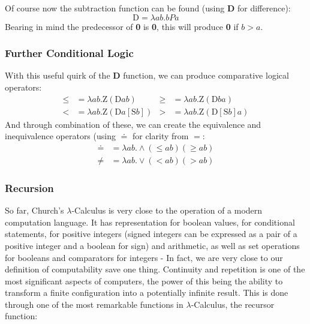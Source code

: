 \documentclass[Master.tex]{subfiles}
\begin{document}
Of course now the subtraction function can be found (using \textbf{D} for difference):
\begin{equation*}
\bm{\mathrm{D}} = \lambda ab.bPa
\end{equation*}
Bearing in mind the predecessor of \textbf{0} is \textbf{0}, this will produce \textbf{0} if $b>a$.
\subsubsection{Further Conditional Logic}

With this useful quirk of the \textbf{D} function, we can produce comparative logical operators:
\begin{equation*}
\begin{aligned}
\bm{\leq} &= \lambda ab.\bm{\mathrm{Z}}(\bm{\mathrm{D}}ab)
  & %
\bm{\geq} &= \lambda ab.\bm{\mathrm{Z}}(\bm{\mathrm{D}}ba)
  \\
\bm{<} &= \lambda ab.\bm{\mathrm{Z}}(\bm{\mathrm{D}}a[\bm{\mathrm{S}}b])
  &
\bm{>} &= \lambda ab.\bm{\mathrm{Z}}(\bm{\mathrm{D}}[\bm{\mathrm{S}}b]a)
\end{aligned}
\end{equation*}
And through combination of these, we can create the equivalence and inequivalence operators (using $\bm{\doteq}$ for clarity from $=$:
\begin{equation*}
\begin{aligned}
\bm{\doteq} &= \lambda ab.\wedge(\bm{\leq}ab)(\bm{\geq}ab)\\
\bm{\neq} &= \lambda ab.\vee(\bm{<}ab)(\bm{>}ab)
\end{aligned}
\end{equation*}
\subsubsection{Recursion}

So far, Church's $\lambda$-Calculus is very close to the operation of a modern computation language. It has representation for boolean values, for conditional statements, for positive integers (signed integers can be expressed as a pair of a positive integer and a boolean for sign) and arithmetic, as well as set operations for booleans and comparators for integers - In fact, we are very close to our definition of computability save one thing. Continuity and repetition is one of the most significant aspects of computers, the power of this being the ability to transform a finite configuration into a potentially infinite result. This is done through one of the most remarkable functions in $\lambda$-Calculus, the recursor function:
\end{document}
